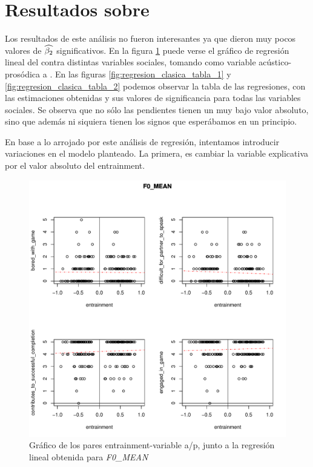 \section{Resultados sobre \entrainment}

Los resultados de este análisis no fueron interesantes ya que dieron muy pocos valores de $\widehat{\beta_2}$ significativos. En la figura \ref{fig:regresion_clasica} puede verse el gráfico de regresión lineal del \entrainment contra distintas variables sociales, tomando como variable acústico-prosódica a \FOMEAN. En las figuras \ref{fig:regresion_clasica_tabla_1} y \ref{fig:regresion_clasica_tabla_2} podemos observar la tabla de las regresiones, con las estimaciones obtenidas y sus valores de significancia para todas las variables sociales. Se observa que no sólo las pendientes tienen un muy bajo valor absoluto, sino que además ni siquiera tienen los signos que esperábamos en un principio.

En base a lo arrojado por este análisis de regresión, intentamos introducir variaciones en el modelo planteado. La primera, es cambiar la variable explicativa por el valor absoluto del entrainment.


\begin{figure}[b!]
\includegraphics[width=15cm]{images/regression_F0_MEAN_1.pdf}
\caption{Gráfico de los pares entrainment-variable a/p, junto a la regresión lineal obtenida para \emph{F0\_MEAN}}
\label{fig:regresion_clasica}
\end{figure}


